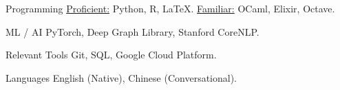 

\begin{cvskills}

  \cvskill
  {Programming} %
  {
    \underline{Proficient:} Python, R, \LaTeX. \enspace
    \underline{Familiar:} OCaml, Elixir, Octave.   
  } %
  
  \cvskill
  {ML / AI}
  {PyTorch, Deep Graph Library, Stanford CoreNLP.}

  \cvskill
  {Relevant Tools}
  {Git, SQL, Google Cloud Platform.}
    
  \cvskill
  {Languages} %
  {English (Native), Chinese (Conversational).} %

    
\end{cvskills}


